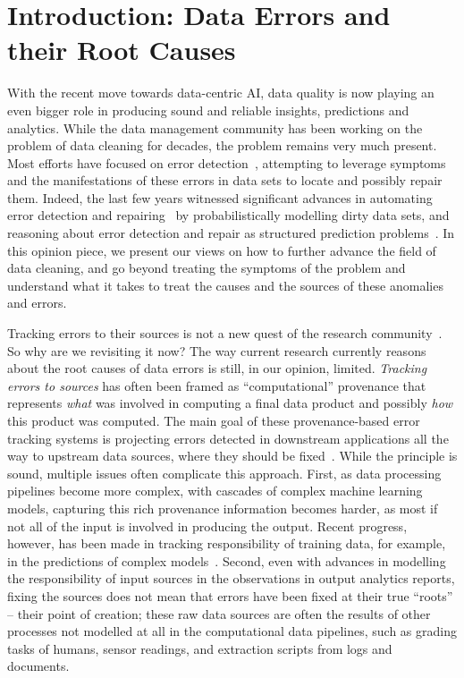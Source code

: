 \section{Introduction: Data Errors and their Root Causes}
\label{sec:intro}

With the recent move towards data-centric AI, data quality is now playing an even bigger role in producing sound and reliable insights, predictions and analytics. While the data management community has been working on the problem of data cleaning for decades, the problem remains very much present. Most efforts have focused on error detection~\cite{DBLP:books/acm/IlyasC19}, attempting to leverage symptoms and the manifestations of these errors in data sets to locate and possibly repair them. 
Indeed, the last few years witnessed significant advances in automating error detection and repairing~\cite{holoclean,holodetect,raha,yeye-unidetect} by probabilistically modelling dirty data sets, and reasoning about error detection and repair as structured prediction problems~\cite{puds,uai_heidari}. In this opinion piece, we present our views on how to further advance the field of data cleaning, and go beyond treating the symptoms of the problem and understand what it takes to treat the causes and the sources of these anomalies and errors.

Tracking errors to their sources is not a new quest of the research community~\cite{DBLP:conf/sigmod/ChalamallaIOP14, DBLP:conf/sigmod/WangM017, DBLP:journals/ftdb/GlavicMR21}. So why are we revisiting it now? %
The way current research currently reasons about the root causes of data errors is still, in our opinion, limited. \emph{Tracking errors to sources} has often been framed as  ``computational'' provenance that represents \emph{what} was involved in computing a final data product and possibly \emph{how} this product was computed. The main goal of these provenance-based error tracking systems is projecting errors detected in downstream applications all the way to upstream data sources, where they should be fixed~\cite{DBLP:conf/sigmod/ChalamallaIOP14}.  While the principle is sound, multiple issues often complicate this approach. First, as data processing pipelines become more complex, with cascades of complex machine learning models, capturing this rich provenance information becomes harder, as most if not all of the input is involved in producing the output. Recent progress, however, has been made in tracking responsibility of training data, for example, in the predictions of complex models~\cite{DBLP:journals/corr/abs-2002-08484,pmlr-koh-Liang,DBLP:journals/corr/abs-2202-00622}. Second, even with advances in modelling the responsibility of input sources in the observations in output analytics reports, fixing the sources does not mean that errors have been fixed at their true ``roots'' -- their point of creation; these raw data sources are often the results of other processes not modelled at all in the computational data pipelines, such as grading tasks of humans, sensor readings, and extraction scripts from logs and documents.  

